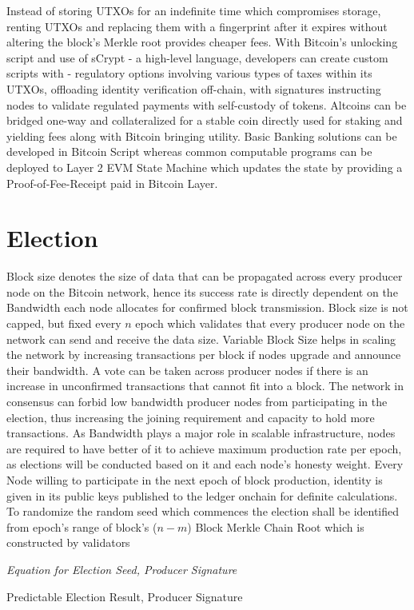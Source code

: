 \documentclass[a4paper,10pt]{article}
\begin{document}
Instead of storing UTXOs for an indefinite time which compromises storage, renting UTXOs and replacing them with a fingerprint after it expires without altering the block's Merkle root provides cheaper fees. With Bitcoin's unlocking script and use of sCrypt - a high-level language, developers can create custom scripts with - regulatory options involving various types of taxes within its UTXOs, offloading identity verification off-chain, with signatures instructing nodes to validate regulated payments with self-custody of tokens. Altcoins can be bridged one-way and collateralized for a stable coin directly used for staking and yielding fees along with Bitcoin bringing utility. Basic Banking solutions can be developed in Bitcoin Script whereas common computable programs can be deployed to Layer 2 EVM State Machine which updates the state by providing a Proof-of-Fee-Receipt paid in Bitcoin Layer. 
\section{Election}
Block size denotes the size of data that can be propagated across every producer node on the Bitcoin network, hence its success rate is directly dependent on the Bandwidth each node allocates for confirmed block transmission. Block size is not capped, but fixed every $n$ epoch which validates that every producer node on the network can send and receive the data size. Variable Block Size helps in scaling the network by increasing transactions per block if nodes upgrade and announce their bandwidth. A vote can be taken across producer nodes if there is an increase in unconfirmed transactions that cannot fit into a block. The network in consensus can forbid low bandwidth producer nodes from participating in the election, thus increasing the joining requirement and capacity to hold more transactions. As Bandwidth plays a major role in scalable infrastructure, nodes are required to have better of it to achieve maximum production rate per epoch, as elections will be conducted based on it and each node's honesty weight. Every Node willing to participate in the next epoch of block production, identity is given in its public keys published to the ledger onchain for definite calculations. To randomize the random seed which commences the election shall be identified from epoch's range of block's ($n-m$) Block Merkle Chain Root which is constructed by validators

\textit{Equation for Election Seed, Producer Signature}

Predictable Election Result, Producer Signature
\end{document}
